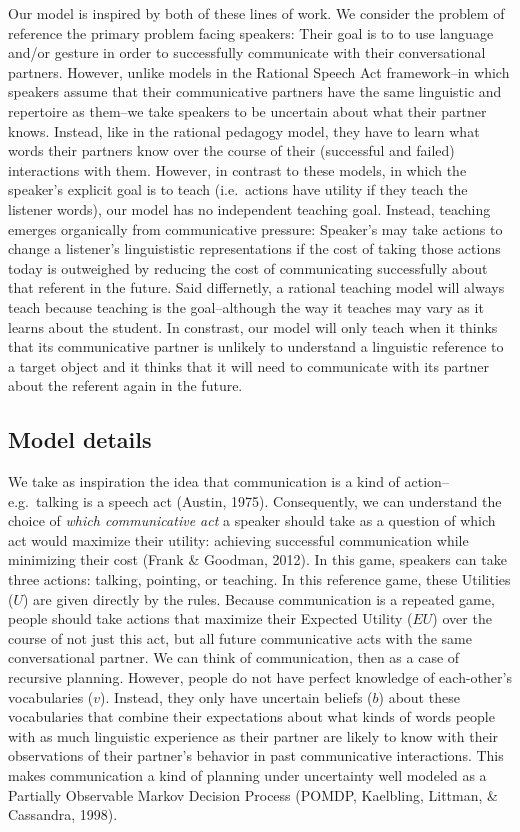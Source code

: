 \documentclass[english,,man,floatsintext]{apa6}
\begin{document}
Our model is inspired by both of these lines of work. We consider the problem of reference the primary problem facing speakers: Their goal is to to use language and/or gesture in order to successfully communicate with their conversational partners. However, unlike models in the Rational Speech Act framework--in which speakers assume that their communicative partners have the same linguistic and repertoire as them--we take speakers to be uncertain about what their partner knows. Instead, like in the rational pedagogy model, they have to learn what words their partners know over the course of their (successful and failed) interactions with them. However, in contrast to these models, in which the speaker's explicit goal is to teach (i.e.~actions have utility if they teach the listener words), our model has no independent teaching goal. Instead, teaching emerges organically from communicative pressure: Speaker's may take actions to change a listener's linguististic representations if the cost of taking those actions today is outweighed by reducing the cost of communicating successfully about that referent in the future. Said differnetly, a rational teaching model will always teach because teaching is the goal--although the way it teaches may vary as it learns about the student. In constrast, our model will only teach when it thinks that its communicative partner is unlikely to understand a linguistic reference to a target object and it thinks that it will need to communicate with its partner about the referent again in the future.

\hypertarget{model-details}{%
\subsection{Model details}\label{model-details}}

We take as inspiration the idea that communication is a kind of action--e.g.~talking is a speech act (Austin, 1975). Consequently, we can understand the choice of \emph{which communicative act} a speaker should take as a question of which act would maximize their utility: achieving successful communication while minimizing their cost (Frank \& Goodman, 2012). In this game, speakers can take three actions: talking, pointing, or teaching. In this reference game, these Utilities (\(U\)) are given directly by the rules. Because communication is a repeated game, people should take actions that maximize their Expected Utility (\(EU\)) over the course of not just this act, but all future communicative acts with the same conversational partner. We can think of communication, then as a case of recursive planning. However, people do not have perfect knowledge of each-other's vocabularies (\(v\)). Instead, they only have uncertain beliefs (\(b\)) about these vocabularies that combine their expectations about what kinds of words people with as much linguistic experience as their partner are likely to know with their observations of their partner's behavior in past communicative interactions. This makes communication a kind of planning under uncertainty well modeled as a Partially Observable Markov Decision Process (POMDP, Kaelbling, Littman, \& Cassandra, 1998).
\end{document}

